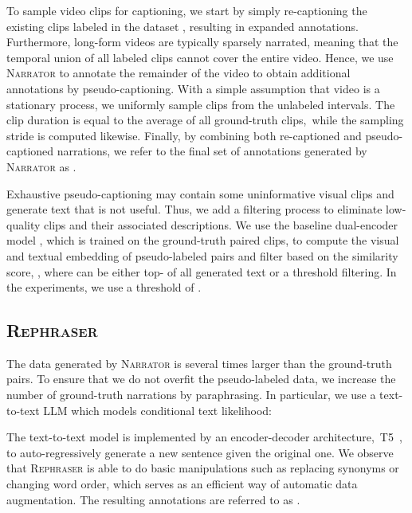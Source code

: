 \documentclass[10pt,twocolumn,letterpaper]{article}
\newcommand{\myparagraph}[1]{\vspace{0pt}\noindent{\bf #1}}
\newcommand{\narrator}{\textsc{Narrator}\xspace}
\newcommand{\rephraser}{\textsc{Rephraser}\xspace}
\begin{document}
To sample video clips for captioning, we start by simply re-captioning the existing clips labeled in the dataset , resulting in expanded annotations. Furthermore, long-form videos are typically sparsely narrated, meaning that the temporal union of all labeled clips cannot cover the entire video.
Hence, we use \narrator to annotate the remainder of the video to obtain additional annotations by pseudo-captioning.
With a simple assumption that video is a stationary process, we uniformly sample clips from the unlabeled intervals.
The clip duration is equal to the average of all ground-truth clips,~\ie  while the sampling stride is computed likewise.
Finally, by combining both re-captioned and pseudo-captioned narrations, we refer to the final set of annotations generated by \narrator as .






\myparagraph{Post-processing.}
Exhaustive pseudo-captioning may contain some uninformative visual clips and generate text that is not useful.
Thus, we add a filtering process to eliminate low-quality clips and their associated descriptions.
We use the baseline dual-encoder model , which is trained on the ground-truth paired clips, to compute the visual and textual embedding of pseudo-labeled pairs and filter based on the similarity score, \ie , where  can be either top- of all generated text or a threshold filtering.
In the experiments, we use a threshold of .




\subsection{\bf \rephraser}
\label{sec:method:paraphrase}
The data generated by \narrator is several times larger than the ground-truth pairs.
To ensure that we do not overfit the pseudo-labeled data, we increase the number of ground-truth narrations by paraphrasing.
In particular, we use a text-to-text LLM which models conditional text likelihood:
{\small

}
The text-to-text model is implemented by an encoder-decoder architecture,~\eg T5~\cite{raffel2020t5}, to auto-regressively generate a new sentence given the original one.
We observe that \rephraser is able to do basic manipulations such as replacing synonyms or changing word order, which serves as an efficient way of automatic data augmentation. The resulting annotations are referred to as .
\end{document}
